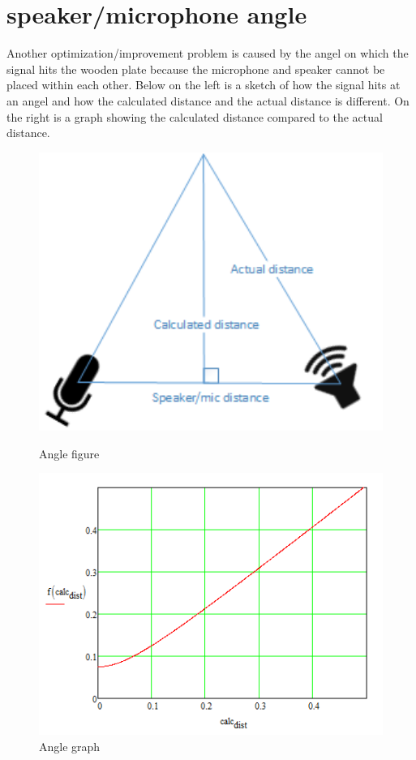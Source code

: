\section{speaker/microphone angle}
Another optimization/improvement problem is caused by the angel on which the signal hits the wooden plate because the microphone and speaker cannot be placed within each other. Below on the left is a sketch of how the signal hits at an angel and how the calculated distance and the actual distance is different. On the right is a graph showing the calculated distance compared to the actual distance.
\begin{figure}[H]
\begin{minipage}[b]{0.49\linewidth}
\centering
\includegraphics[width=1\textwidth]{billeder/angle_error}
\caption{Angle figure}
\end{minipage}
\hspace{0.5cm}
\begin{minipage}[b]{0.49\linewidth}
\centering
\includegraphics[width=1\textwidth]{billeder/angle_graph}
\caption{Angle graph}
\end{minipage}
\end{figure}
